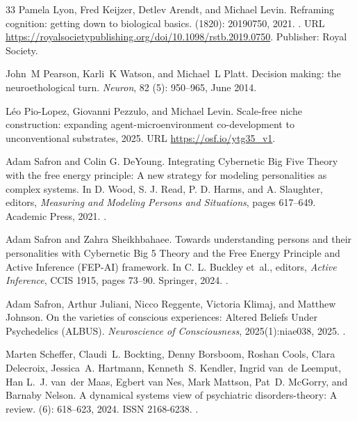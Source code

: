 \documentclass[12pt,fleqn]{article}
\begin{document}
\begin{thebibliography}{33}
  Pamela Lyon, Fred Keijzer, Detlev Arendt, and Michael Levin.
  \newblock Reframing cognition: getting down to biological basics.
   (1820): 20190750, 2021.
  \newblock {}.
  \newblock URL
  \url{https://royalsocietypublishing.org/doi/10.1098/rstb.2019.0750}.
  \newblock Publisher: Royal Society.

  John~M Pearson, Karli~K Watson, and Michael~L Platt.
  \newblock Decision making: the neuroethological turn.
  \newblock \emph{Neuron}, 82 (5): 950--965, June 2014.

  L\'eo Pio-Lopez, Giovanni Pezzulo, and Michael Levin.
  \newblock Scale-free niche construction: expanding agent-microenvironment
  co-development to unconventional substrates, 2025.
  \newblock URL \url{https://osf.io/ytg35_v1}.

  Adam Safron and Colin G. DeYoung.
  \newblock Integrating Cybernetic Big Five Theory with the free energy
  principle: A new strategy for modeling personalities as complex systems.
  \newblock In D. Wood, S. J. Read, P. D. Harms, and A. Slaughter, editors,
  \emph{Measuring and Modeling Persons and Situations}, pages 617--649.
  Academic Press, 2021.
  \newblock {}.

  Adam Safron and Zahra Sheikhbahaee.
  \newblock Towards understanding persons and their personalities with
  Cybernetic Big 5 Theory and the Free Energy Principle and Active Inference
  (FEP-AI) framework.
  \newblock In C. L. Buckley et~al., editors, \emph{Active Inference},
  CCIS 1915, pages 73--90. Springer, 2024.
  \newblock {}.

  Adam Safron, Arthur Juliani, Nicco Reggente, Victoria Klimaj, and Matthew Johnson.
  \newblock On the varieties of conscious experiences: Altered Beliefs Under
  Psychedelics (ALBUS).
  \newblock \emph{Neuroscience of Consciousness}, 2025(1):niae038, 2025.
  \newblock {}.

  Marten Scheffer, Claudi~L. Bockting, Denny Borsboom, Roshan Cools, Clara
  Delecroix, Jessica~A. Hartmann, Kenneth~S. Kendler, Ingrid van~de Leemput,
  Han L.~J. van~der Maas, Egbert van Nes, Mark Mattson, Pat~D. {McGorry}, and
  Barnaby Nelson.
  \newblock A dynamical systems view of psychiatric disorders-theory: A review.
   (6): 618--623, 2024.
  \newblock ISSN 2168-6238.
  \newblock {}.


\end{thebibliography}
\end{document}
